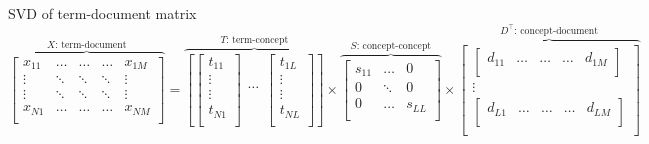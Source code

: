 \documentclass[xcolor=table]{beamer}
\begin{document}
\begin{frame}
	
	\begin{block}{SVD of term-document matrix}
		\scriptsize\bfseries
		\[
		\overbrace{
			\begin{bmatrix}
			x_{11} & \ldots & \ldots & \ldots & x_{1M} \\ 
			\vdots & \ddots & \ddots & \ddots &\vdots \\
			\vdots & \ddots & \ddots & \ddots &\vdots \\
			x_{N1} & \ldots & \ldots & \ldots & x_{NM} \\ 
			\end{bmatrix}
		}^{X \text{: term-document}}
		=
		\overbrace{
			\left[
			\begin{bmatrix}
			t_{11} \\ 
			\vdots \\
			\vdots \\
			t_{N1} \\ 
			\end{bmatrix}
			\begin{matrix}
			\ldots \\ 
			\end{matrix}
			\begin{bmatrix}
			t_{1L} \\ 
			\vdots \\
			\vdots \\
			t_{NL} \\ 
			\end{bmatrix}
			\right]
		}^{T \text{: term-concept}}
		\times 
		\overbrace{
			\begin{bmatrix}
			s_{11} & \ldots & 0 \\
			0 & \ddots & 0 \\
			0 & \ldots & s_{LL} \\
			\end{bmatrix}
		}^{S \text{: concept-concept}}
		\times 
		\overbrace{
			\begin{bmatrix}
			\begin{bmatrix}
			d_{11} & \ldots & \ldots & \ldots & d_{1M} \\
			\end{bmatrix}\\
			\vdots \\
			\begin{bmatrix}
			d_{L1} & \ldots & \ldots & \ldots & d_{LM} \\
			\end{bmatrix}\\
			\end{bmatrix}
		}^{D^\top \text{: concept-document}}
		\]
		
	\end{block}
	
\end{frame}
\end{document}
